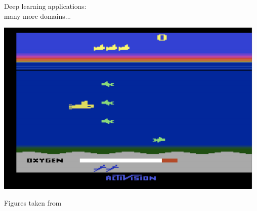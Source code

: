 \begin{frame}{Deep learning  applications:\\
many more domains...}
\begin{minipage}{0.25\linewidth}
\begin{center}
  \end{center}
\end{minipage}
\begin{minipage}{0.4\linewidth}
  \begin{center}
    \includegraphics[height=0.4\textheight]{figures/applications/atari.png}
  \end{center}
\end{minipage}

\vspace{2mm}
{\small Figures taken from }
\end{frame}

